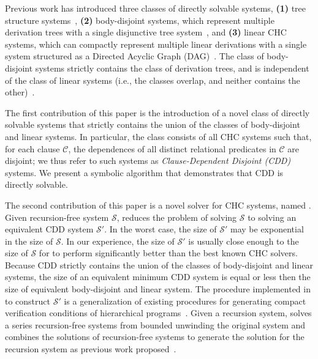 Previous work has introduced three classes of directly solvable systems,
\textbf{(1)} tree structure systems~\cite{heizmann10,bjorner13,mcmillan14}, %
\textbf{(2)} body-disjoint systems, which represent multiple
derivation trees with a single disjunctive tree
system~\cite{rummer13a,rummer13b}, and
\textbf{(3)} linear CHC systems, which can compactly represent
multiple linear derivations with a single system structured as a
Directed Acyclic Graph (DAG)~\cite{albarghouthi12a}.
%
The class of body-disjoint systems strictly contains the class of
derivation trees, and is independent of the class of linear systems
(i.e., the classes overlap, and neither contains the
other)~\cite{rummer13a,rummer13b}.


The first contribution of this paper is the introduction of a novel
class of directly solvable systems that strictly
contains the union of the classes of body-disjoint and linear systems.
%
In particular, the class consists of all CHC systems such that, for
each clause $\mathcal{C}$, the dependences of all distinct relational
predicates in $\mathcal{C}$ are disjoint;
%
we thus refer to such systems as \emph{Clause-Dependent Disjoint
  (CDD)} systems.
%
We present a symbolic algorithm that demonstrates that CDD is directly solvable.
%

The second contribution of this paper is a novel solver for
CHC systems, named \sys.
%
Given recursion-free system $\mathcal{S}$, \sys reduces the problem
of solving $\mathcal{S}$ to solving an equivalent CDD system
$\mathcal{S}'$.
%
In the worst case, the size of $\mathcal{S}'$ may be exponential in the size of
$\mathcal{S}$.
%
In our experience, the size of $\mathcal{S}'$ is usually close enough
to the size of $\mathcal{S}$ for \sys to perform significantly better
than the best known CHC solvers.
%
Because CDD strictly contains the union of the classes 
of body-disjoint and linear systems, the size of an equivalent minimum 
CDD system is equal or less then the size of equivalent body-disjoint and
linear system.
%
The procedure implemented in \sys to construct $\mathcal{S}'$ is a
generalization of existing procedures for generating compact
verification conditions of hierarchical
programs~\cite{flanagan01,lal-qadeer15}.
%
Given a recursion system, \sys solves a series recursion-free systems 
from bounded unwinding the original system and combines the solutions
of recursion-free systems to generate the solution for the recursion system
as previous work proposed~\cite{rummer13b}.
%

